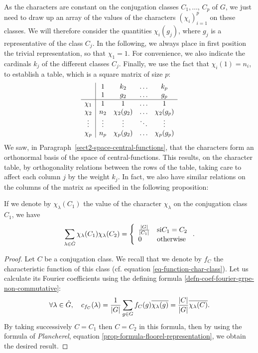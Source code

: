  As the characters are constant on the conjugation classes $ C_1, \ldots, \, C_p $ of $ G $, we just need to draw up an array of the values of the characters $ (\chi_i)_{i = 1}^p $ on these classes. We will therefore consider the quantities $ \chi_i (g_j) $, where $ g_j $ is a representative of the class $ C_j $. In the following, we always place in first position the trivial representation, so that $ \chi_1 = 1 $. For convenience, we also indicate the cardinals $ k_j $ of the different classes $ C_j $. Finally, we use the fact that $ \chi_i (1) = n_i $, to establish a table, which is a square matrix of size $ p $:
\begin{equation*}
\begin{array}{c | cccc} & 1 & k_2 & \ldots & k_p \\& 1 & g_2 & \ldots & g_p \\\hline \chi_1 & 1 & 1 & \ldots & 1 \\\chi_2 & n_2 & \chi_2 (g_2) & \ldots & \chi_2 (g_p) \\\vdots & \vdots & \vdots & \ddots & \vdots \\\chi_p & n_p & \chi_p (g_2) & \ldots & \chi_p (g_p) \end{array}
\end{equation*}
We saw, in Paragraph~\ref{sect2-space-central-functions}, that the characters form an orthonormal basis of the space of central-functions. This results, on the character table, by orthogonality relations between the rows of the table, taking care to affect each column $ j $ by the weight $ k_j $. In fact, we also have similar relations on the columns of the matrix as specified in the following proposition:
 
\begin{prop}
\label{prop-orthogonalite-columns}
If we denote by $ \chi_{\lambda} (C_1) $ the value of the character $ \chi_\lambda $ on the conjugation class $ C_1 $, we have
\begin{equation*}
\sum_{\lambda \in \hat{G}}{\chi_{\lambda} (C_1) \chi_{\lambda} (C_2)} = \left\{\begin{array}{ll} \frac{|G|}{| C_1 |} & \text{si} C_1 = C_2 \\0 & \text{otherwise} \end{array} \right. .
\end{equation*}
\end{prop}
\begin{proof}
Let $ C $ be a conjugation class. We recall that we denote by $ f_C $ the characteristic function of this class (cf. equation \eqref{eq-function-char-class}). Let us calculate its Fourier coefficients using the defining formula \eqref{defn-coef-fourier-grpe-non-commutative}:
\begin{equation*}
\forall \lambda \in \hat{G}, \quad c_{f_C} (\lambda) = \frac{1}{|G|} \sum_{g \in G}{f_C (g) \overline{\chi_{\lambda} (g)}} = \frac{| C |}{|G|} \overline{\chi_{\lambda} (C)}.
\end{equation*}
By taking successively $ C = C_1 $ then $ C = C_2 $ in this formula, then by using the formula of \textit{Plancherel}, equation \eqref{prop-formula-floorel-representation}, we obtain the desired result.
\end{proof}
 

